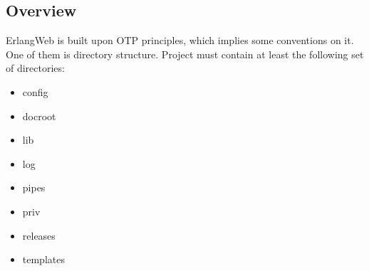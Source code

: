 \subsection{Overview}ErlangWeb is built upon OTP principles, which implies some conventions on it. One of them is directory structure. Project must contain at least the following set of directories:
\begin{itemize}
\item config
\item docroot
\item lib
\item log
\item pipes
\item priv
\item releases
\item templates
\end{itemize}


